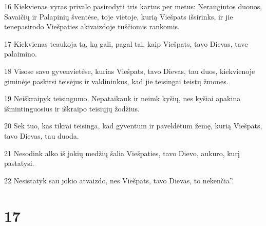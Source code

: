 \par 16 Kiekvienas vyras privalo pasirodyti tris kartus per metus: Neraugintos duonos, Savaičių ir Palapinių šventėse, toje vietoje, kurią Viešpats išsirinks, ir jie tenepasirodo Viešpaties akivaizdoje tuščiomis rankomis. 
\par 17 Kiekvienas teaukoja tą, ką gali, pagal tai, kaip Viešpats, tavo Dievas, tave palaimino. 
\par 18 Visose savo gyvenvietėse, kurias Viešpats, tavo Dievas, tau duos, kiekvienoje giminėje paskirsi teisėjus ir valdininkus, kad jie teisingai teistų žmones. 
\par 19 Neiškraipyk teisingumo. Nepataikauk ir neimk kyšių, nes kyšiai apakina išmintinguosius ir iškraipo teisiųjų žodžius. 
\par 20 Sek tuo, kas tikrai teisinga, kad gyventum ir paveldėtum žemę, kurią Viešpats, tavo Dievas, tau duoda. 
\par 21 Nesodink alko iš jokių medžių šalia Viešpaties, tavo Dievo, aukuro, kurį pastatysi. 
\par 22 Nesistatyk sau jokio atvaizdo, nes Viešpats, tavo Dievas, to nekenčia”.



\chapter{17}

